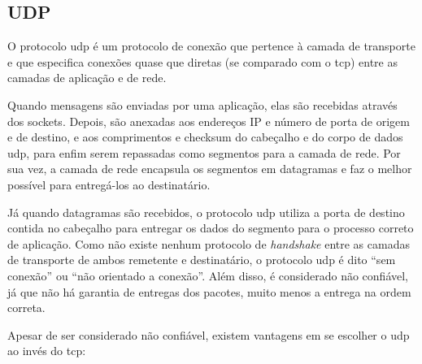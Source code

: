 
\subsection*{UDP}

O protocolo \gls*{udp} é um protocolo de conexão que pertence à camada de transporte e
que especifica conexões quase que diretas (se comparado com o \gls*{tcp}) entre as
camadas de aplicação e de rede.

Quando mensagens são enviadas por uma aplicação, elas são recebidas através dos
\glspl*{socket}. Depois, são anexadas aos endereços IP e número de porta de origem e de
destino, e aos comprimentos e \gls{checksum} do cabeçalho e do corpo de dados
\gls*{udp}, para enfim serem repassadas como segmentos para a camada de rede. Por sua
vez, a camada de rede encapsula os segmentos em datagramas e faz o melhor possível para
entregá-los ao destinatário.

Já quando datagramas são recebidos, o protocolo \gls*{udp} utiliza a porta de destino
contida no cabeçalho para entregar os dados do segmento para o processo correto de
aplicação. Como não existe nenhum protocolo de \emph{handshake} entre as camadas de
transporte de ambos remetente e destinatário, o protocolo \gls*{udp} é dito ``sem
conexão'' ou ``não orientado a conexão''. Além disso, é considerado não confiável, já
que não há garantia de entregas dos pacotes, muito menos a entrega na ordem correta.

Apesar de ser considerado não confiável, existem vantagens em se escolher o \gls*{udp}
ao invés do \gls*{tcp}:

